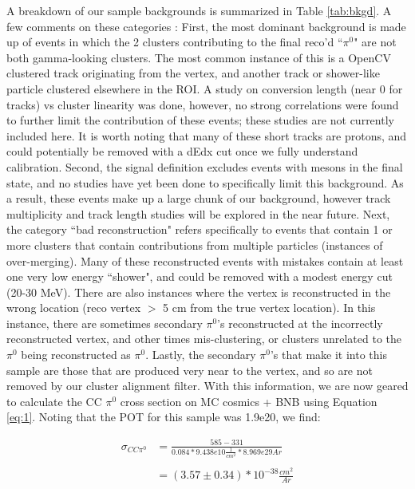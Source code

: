 \documentclass[12pt]{article}
\begin{document}
\par A breakdown of our sample backgrounds is summarized in Table \ref{tab:bkgd}. A few comments on these categories : First, the most dominant background is made up of events in which the 2 clusters contributing to the final reco'd ``$\pi^0$" are not both gamma-looking clusters. The most common instance of this is a OpenCV clustered track originating from the vertex, and another track or shower-like particle clustered elsewhere in the ROI. A study on conversion length (near 0 for tracks) vs cluster linearity was done, however, no strong correlations were found to further limit the contribution of these events; these studies are not currently included here. It is worth noting that many of these short tracks are protons, and could potentially be removed with a dEdx cut once we fully understand calibration. Second, the signal definition excludes events with mesons in the final state, and no studies have yet been done to specifically limit this background. As a result, these events make up a large chunk of our background, however track multiplicity and track length studies will be explored in the near future. Next, the category ``bad reconstruction" refers specifically to events that contain 1 or more clusters that contain contributions from multiple particles (instances of over-merging). Many of these reconstructed events with mistakes contain at least one very low energy ``shower", and could  be removed with a modest energy cut (20-30 MeV).  There are also instances where the vertex is reconstructed in the wrong location (reco vertex $>$ 5 cm from the true vertex location). In this instance, there are sometimes secondary $\pi^0$'s reconstructed at the incorrectly reconstructed vertex, and other times mis-clustering, or clusters unrelated to the $\pi^0$ being reconstructed as $\pi^0$. Lastly, the secondary $\pi^0$'s that make it into this sample are those that are produced very near to the vertex, and so are not removed by our cluster alignment filter. 
With this information, we are now geared to calculate the CC $\pi^0$ cross section on MC cosmics + BNB using Equation \ref{eq:1}. Noting that the POT for this sample was 1.9e20, we find:

\begin{align}
\sigma_{CC\pi^0} &= \frac{585 - 331}{0.084 * 9.438e10 \frac{1}{cm^2} * 8.969e29 Ar} \\\\
&= (3.57 \pm 0.34) *10^{-38} \frac{cm^2}{Ar}
\end{align}
\end{document}

